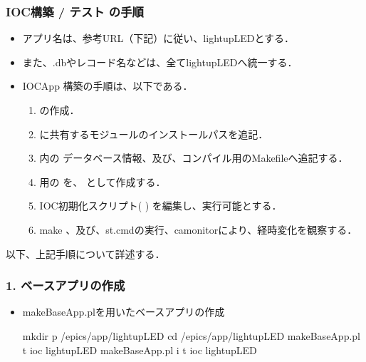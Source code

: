 \documentclass[letterpaper,10pt,dvipdfmx]{sphinxmanual}
\begin{document}
\subsubsection{IOC構築 / テスト の手順}
\label{\detokenize{epics/rst/example3__arduino_LEDcontrol01:id3}}\begin{itemize}
\item {} 
アプリ名は、参考URL（下記）に従い、lightupLEDとする．

\item {} 
また、.dbやレコード名などは、全てlightupLEDへ統一する．

\item {} 
IOC\sphinxhyphen{}App 構築の手順は、以下である．
\begin{enumerate}
%
\item {} 
 の作成．

\item {} 
 に共有するモジュールのインストールパスを追記．

\item {} 
 内の データベース情報、及び、コンパイル用のMakefileへ追記する．

\item {} 
 用の  を、  として作成する．

\item {} 
IOC初期化スクリプト(  ) を編集し、実行可能とする．

\item {} 
make 、及び、st.cmdの実行、camonitorにより、経時変化を観察する．

\end{enumerate}

\end{itemize}

以下、上記手順について詳述する．


\subsubsection{1. ベースアプリの作成}
\label{\detokenize{epics/rst/example3__arduino_LEDcontrol01:id4}}\begin{itemize}
\item {} 
makeBaseApp.plを用いたベースアプリの作成

\begin{sphinxVerbatim}[commandchars=\\\{\}]
\PYGZdl{} mkdir \PYGZhy{}p \PYGZti{}/epics/app/lightupLED
\PYGZdl{} cd  \PYGZti{}/epics/app/lightupLED
\PYGZdl{} makeBaseApp.pl \PYGZhy{}t ioc lightupLED
\PYGZdl{} makeBaseApp.pl \PYGZhy{}i \PYGZhy{}t ioc lightupLED
\end{sphinxVerbatim}

\end{itemize}
\end{document}
